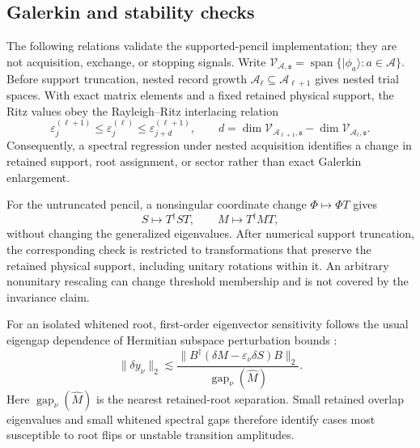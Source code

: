 \documentclass[
  reprint,
  amsmath,
  amssymb,
  aps,
  pra,
  nofootinbib,
  superscriptaddress,
  floatfix
]{revtex4-2}
\newcommand{\Acal}{\mathcal{A}}
\newcommand{\Vcal}{\mathcal{V}}
\newcommand{\spanop}{\operatorname{span}}
\newcommand{\ket}[1]{|#1\rangle}
\begin{document}
\subsection{Galerkin and stability checks}

The following relations validate the supported-pencil implementation; they are not acquisition, exchange, or stopping signals.  Write
$\Vcal_{\Acal,\mathfrak s}=\spanop\{\ket{\phi_a}:a\in\Acal\}$.  Before support truncation, nested record growth $\Acal_\ell\subseteq\Acal_{\ell+1}$ gives nested trial spaces.  With exact matrix elements and a fixed retained physical support, the Ritz values obey the Rayleigh--Ritz interlacing relation \cite{GolubVanLoan2013MatrixComputations}
\begin{equation}
\varepsilon_j^{(\ell+1)}
\le
\varepsilon_j^{(\ell)}
\le
\varepsilon_{j+d}^{(\ell+1)},
\qquad
d=\dim\Vcal_{\Acal_{\ell+1},\mathfrak s}-\dim\Vcal_{\Acal_\ell,\mathfrak s}.
\label{eq:qse_ritz_interlacing}
\end{equation}
Consequently, a spectral regression under nested acquisition identifies a change in retained support, root assignment, or sector rather than exact Galerkin enlargement.

For the untruncated pencil, a nonsingular coordinate change $\Phi\mapsto\Phi T$ gives
\begin{equation}
S\mapsto T^\dagger S T,
\qquad
M\mapsto T^\dagger M T,
\label{eq:qse_basis_change_invariance}
\end{equation}
without changing the generalized eigenvalues.  After numerical support truncation, the corresponding check is restricted to transformations that preserve the retained physical support, including unitary rotations within it.  An arbitrary nonunitary rescaling can change threshold membership and is not covered by the invariance claim.

For an isolated whitened root, first-order eigenvector sensitivity follows the usual eigengap dependence of Hermitian subspace perturbation bounds \cite{DavisKahan1970}:
\begin{equation}
\|\delta y_\nu\|_2
\lesssim
\frac{
\|B^\dagger(\delta M-\varepsilon_\nu\delta S)B\|_2
}{
\operatorname{gap}_\nu(\widehat M)
}.
\label{eq:qse_root_gap_sensitivity}
\end{equation}
Here $\operatorname{gap}_\nu(\widehat M)$ is the nearest retained-root separation.  Small retained overlap eigenvalues and small whitened spectral gaps therefore identify cases most susceptible to root flips or unstable transition amplitudes.
\end{document}
